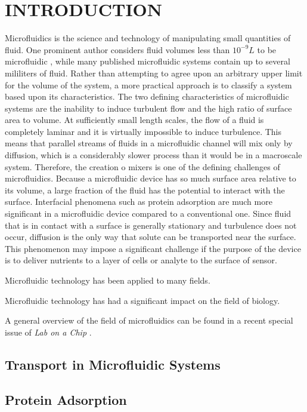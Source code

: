 
\chapter{INTRODUCTION}

Microfluidics is the science and technology of manipulating small
quantities of fluid. One prominent author considers fluid volumes
less than $10^{-9}L$ to be microfluidic \cite{Whitesides2006}, while
many published microfluidic systems contain up to several mililiters
of fluid. Rather than attempting to agree upon an arbitrary upper
limit for the volume of the system, a more practical approach is to
classify a system based upon its characteristics. The two defining
characteristics of microfluidic systems are the inability to induce
turbulent flow and the high ratio of surface area to volume. At sufficiently
small length scales, the flow of a fluid is completely laminar and
it is virtually impossible to induce turbulence. This means that parallel
streams of fluids in a microfluidic channel will mix only by diffusion,
which is a considerably slower process than it would be in a macroscale
system. Therefore, the creation o mixers is one of the defining challenges
of microfluidics. Because a microfluidic device has so much surface
area relative to its volume, a large fraction of the fluid has the
potential to interact with the surface. Interfacial phenomena such
as protein adsorption are much more significant in a microfluidic
device compared to a conventional one. Since fluid that is in contact
with a surface is generally stationary and turbulence does not occur,
diffusion is the only way that solute can be transported near the
surface. This phenomenon may impose a significant challenge if the
purpose of the device is to deliver nutrients to a layer of cells
or analyte to the surface of sensor.

Microfluidic technology has been applied to many fields.

Microfluidic technology has had a significant impact on the field
of biology.

A general overview of the field of microfluidics can be found in a
recent special issue of \emph{Lab on a Chip} \cite{Santiago2009}.


\section{Transport in Microfluidic Systems}


\section{Protein Adsorption}

